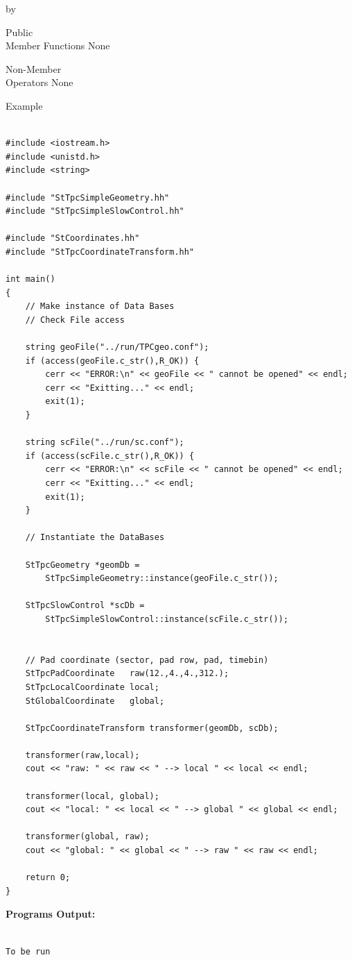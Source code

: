 \documentclass[twoside]{article}
\newcommand{\entrylabel}[1]{\mbox{\textbf{{#1}}}\hfil}%
\newenvironment{entry}
{\begin{list}{}%
    {\renewcommand{\makelabel}{\entrylabel}%
     \setlength{\labelwidth}{90pt}%
     \setlength{\leftmargin}{\labelwidth}
     \advance\leftmargin by \labelsep%
      }%
    }%
  {\end{list}}
\newcommand{\Entrylabel}[1]%
{\raisebox{0pt}[1ex][0pt]{\makebox[\labelwidth][l]%
    {\parbox[t]{\labelwidth}{\hspace{0pt}\textbf{{#1}}}}}}
\newenvironment{Entry}%
{\renewcommand{\entrylabel}{\Entrylabel}\begin{entry}}%
  {\end{entry}}
\begin{document}
\begin{Entry}
\item[Public \\ Member Functions]
  None

\item[Non-Member \\ Operators]
  None

\item[Example]

{\footnotesize
\begin{verbatim}

#include <iostream.h>
#include <unistd.h>
#include <string>

#include "StTpcSimpleGeometry.hh"
#include "StTpcSimpleSlowControl.hh"

#include "StCoordinates.hh"
#include "StTpcCoordinateTransform.hh"

int main()
{
    // Make instance of Data Bases
    // Check File access

    string geoFile("../run/TPCgeo.conf");
    if (access(geoFile.c_str(),R_OK)) {
        cerr << "ERROR:\n" << geoFile << " cannot be opened" << endl;
        cerr << "Exitting..." << endl;
        exit(1);
    }

    string scFile("../run/sc.conf");
    if (access(scFile.c_str(),R_OK)) {
        cerr << "ERROR:\n" << scFile << " cannot be opened" << endl;
        cerr << "Exitting..." << endl;
        exit(1);
    }

    // Instantiate the DataBases

    StTpcGeometry *geomDb =
        StTpcSimpleGeometry::instance(geoFile.c_str());
    
    StTpcSlowControl *scDb =
        StTpcSimpleSlowControl::instance(scFile.c_str());


    // Pad coordinate (sector, pad row, pad, timebin)
    StTpcPadCoordinate   raw(12.,4.,4.,312.);
    StTpcLocalCoordinate local;
    StGlobalCoordinate   global;

    StTpcCoordinateTransform transformer(geomDb, scDb);

    transformer(raw,local);
    cout << "raw: " << raw << " --> local " << local << endl; 

    transformer(local, global);
    cout << "local: " << local << " --> global " << global << endl; 

    transformer(global, raw);
    cout << "global: " << global << " --> raw " << raw << endl; 

    return 0;
}
\end{verbatim}
}%
{\bf Programs Output:}
{\footnotesize
\begin{verbatim}

To be run

\end{verbatim}
} %

\end{Entry}
\clearpage
\end{document}
